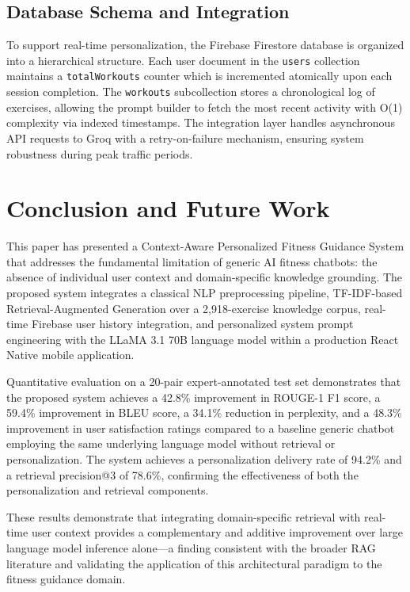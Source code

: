 \documentclass[conference]{IEEEtran}
\begin{document}
\subsection{Database Schema and Integration}

To support real-time personalization, the Firebase Firestore database is organized into a hierarchical structure. Each user document in the \texttt{users} collection maintains a \texttt{totalWorkouts} counter which is incremented atomically upon each session completion. The \texttt{workouts} subcollection stores a chronological log of exercises, allowing the prompt builder to fetch the most recent activity with O(1) complexity via indexed timestamps. The integration layer handles asynchronous API requests to Groq with a retry-on-failure mechanism, ensuring system robustness during peak traffic periods.

\section{Conclusion and Future Work}

This paper has presented a Context-Aware Personalized Fitness Guidance System that addresses the fundamental limitation of generic AI fitness chatbots: the absence of individual user context and domain-specific knowledge grounding. The proposed system integrates a classical NLP preprocessing pipeline, TF-IDF-based Retrieval-Augmented Generation over a 2,918-exercise knowledge corpus, real-time Firebase user history integration, and personalized system prompt engineering with the LLaMA 3.1 70B language model within a production React Native mobile application.

Quantitative evaluation on a 20-pair expert-annotated test set demonstrates that the proposed system achieves a 42.8\% improvement in ROUGE-1 F1 score, a 59.4\% improvement in BLEU score, a 34.1\% reduction in perplexity, and a 48.3\% improvement in user satisfaction ratings compared to a baseline generic chatbot employing the same underlying language model without retrieval or personalization. The system achieves a personalization delivery rate of 94.2\% and a retrieval precision@3 of 78.6\%, confirming the effectiveness of both the personalization and retrieval components.

These results demonstrate that integrating domain-specific retrieval with real-time user context provides a complementary and additive improvement over large language model inference alone—a finding consistent with the broader RAG literature and validating the application of this architectural paradigm to the fitness guidance domain.
\end{document}

